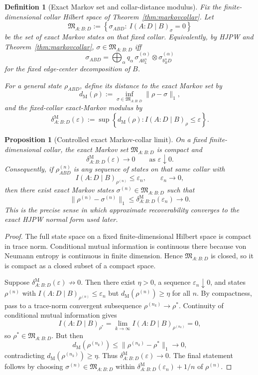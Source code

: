 \documentclass[11pt]{article}
\newtheorem{proposition}[theorem]{Proposition}
\newtheorem{definition}[theorem]{Definition}
\begin{document}
\begin{definition}[Exact Markov set and collar-distance modulus]\label{def:markovmodulus}
Fix the finite-dimensional collar Hilbert space of Theorem~\ref{thm:markovcollar}. Let
\[
\mathfrak M_{A:B:D}
:=
\left\{
\sigma_{ABD}:\ I(A:D\mid B)_\sigma=0
\right\}
\]
be the set of exact Markov states on that fixed collar. Equivalently, by HJPW and Theorem~\ref{thm:markovcollar}, \(\sigma\in\mathfrak M_{A:B:D}\) iff
\[
\sigma_{ABD}
=
\bigoplus_\alpha q_\alpha\,
\sigma^{(\alpha)}_{A b_L^\alpha}\otimes \sigma^{(\alpha)}_{b_R^\alpha D}
\]
for the fixed edge-center decomposition of \(B\).

For a general state \(\rho_{ABD}\), define its distance to the exact Markov set by
\[
d_{\mathrm M}(\rho):=\inf_{\sigma\in\mathfrak M_{A:B:D}}\|\rho-\sigma\|_1,
\]
and the fixed-collar exact-Markov modulus by
\[
\delta^{\mathrm M}_{A:B:D}(\varepsilon)
:=
\sup\left\{
d_{\mathrm M}(\rho):
I(A:D\mid B)_\rho\le \varepsilon
\right\}.
\]
\end{definition}

\begin{proposition}[Controlled exact Markov-collar limit]\label{prop:controlledmarkov}
On a fixed finite-dimensional collar, the exact Markov set \(\mathfrak M_{A:B:D}\) is compact and
\[
\delta^{\mathrm M}_{A:B:D}(\varepsilon)\longrightarrow 0
\qquad
\text{as }\varepsilon\downarrow 0.
\]
Consequently, if \(\rho^{(n)}_{ABD}\) is any sequence of states on that same collar with
\[
I(A:D\mid B)_{\rho^{(n)}}\le \varepsilon_n,
\qquad
\varepsilon_n\to0,
\]
then there exist exact Markov states \(\sigma^{(n)}\in\mathfrak M_{A:B:D}\) such that
\[
\|\rho^{(n)}-\sigma^{(n)}\|_1
\le
\delta^{\mathrm M}_{A:B:D}(\varepsilon_n)
\longrightarrow 0.
\]
This is the precise sense in which approximate recoverability converges to the exact HJPW normal form used later.
\end{proposition}

\begin{proof}
The full state space on a fixed finite-dimensional Hilbert space is compact in trace norm. Conditional mutual information is continuous there because von Neumann entropy is continuous in finite dimension. Hence \(\mathfrak M_{A:B:D}\) is closed, so it is compact as a closed subset of a compact space.

Suppose \(\delta^{\mathrm M}_{A:B:D}(\varepsilon)\not\to 0\). Then there exist \(\eta>0\), a sequence \(\varepsilon_n\downarrow 0\), and states \(\rho^{(n)}\) with \(I(A:D\mid B)_{\rho^{(n)}}\le \varepsilon_n\) but \(d_{\mathrm M}(\rho^{(n)})\ge \eta\) for all \(n\). By compactness, pass to a trace-norm convergent subsequence \(\rho^{(n_k)}\to \rho^\ast\). Continuity of conditional mutual information gives
\[
I(A:D\mid B)_{\rho^\ast}
=
\lim_{k\to\infty} I(A:D\mid B)_{\rho^{(n_k)}}
=
0,
\]
so \(\rho^\ast\in \mathfrak M_{A:B:D}\). But then
\[
d_{\mathrm M}(\rho^{(n_k)})
\le
\|\rho^{(n_k)}-\rho^\ast\|_1
\longrightarrow 0,
\]
contradicting \(d_{\mathrm M}(\rho^{(n_k)})\ge \eta\). Thus \(\delta^{\mathrm M}_{A:B:D}(\varepsilon)\to 0\). The final statement follows by choosing \(\sigma^{(n)}\in\mathfrak M_{A:B:D}\) within \(\delta^{\mathrm M}_{A:B:D}(\varepsilon_n)+1/n\) of \(\rho^{(n)}\).
\end{proof}
\end{document}
